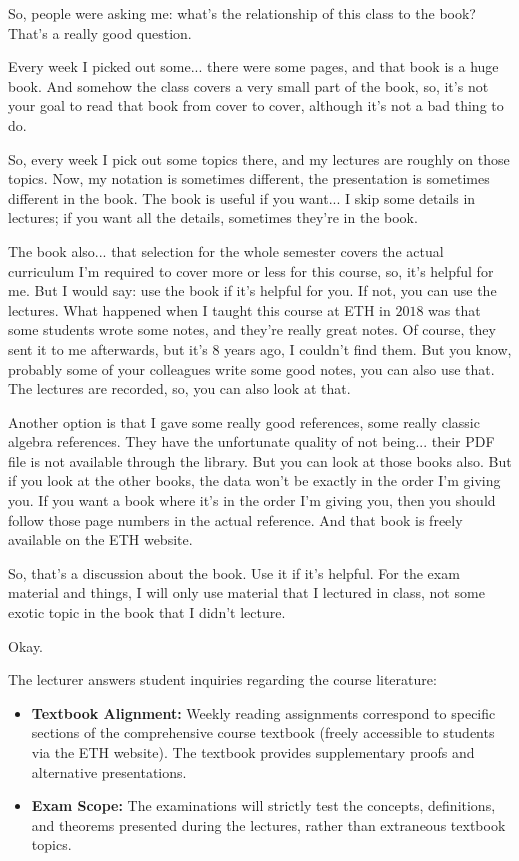 \begin{speech}[00:48:47 - 00:50:58]
So, people were asking me: what's the relationship of this class to the book? That's a really good question. 

Every week I picked out some... there were some pages, and that book is a huge book. And somehow the class covers a very small part of the book, so, it's not your goal to read that book from cover to cover, although it's not a bad thing to do. 

So, every week I pick out some topics there, and my lectures are roughly on those topics. Now, my notation is sometimes different, the presentation is sometimes different in the book. The book is useful if you want... I skip some details in lectures; if you want all the details, sometimes they're in the book. 

The book also... that selection for the whole semester covers the actual curriculum I'm required to cover more or less for this course, so, it's helpful for me. But I would say: use the book if it's helpful for you. If not, you can use the lectures. What happened when I taught this course at ETH in $2018$ was that some students wrote some notes, and they're really great notes. Of course, they sent it to me afterwards, but it's $8$ years ago, I couldn't find them. But you know, probably some of your colleagues write some good notes, you can also use that. The lectures are recorded, so, you can also look at that. 

Another option is that I gave some really good references, some really classic algebra references. They have the unfortunate quality of not being... their PDF file is not available through the library. But you can look at those books also. But if you look at the other books, the data won't be exactly in the order I'm giving you. If you want a book where it's in the order I'm giving you, then you should follow those page numbers in the actual reference. And that book is freely available on the ETH website. 

So, that's a discussion about the book. Use it if it's helpful. For the exam material and things, I will only use material that I lectured in class, not some exotic topic in the book that I didn't lecture. 

Okay.
\end{speech}

\begin{note}
The lecturer answers student inquiries regarding the course literature:
\begin{itemize}
    \item \textbf{Textbook Alignment:} Weekly reading assignments correspond to specific sections of the comprehensive course textbook (freely accessible to students via the ETH website). The textbook provides supplementary proofs and alternative presentations.
    \item \textbf{Exam Scope:} The examinations will strictly test the concepts, definitions, and theorems presented during the lectures, rather than extraneous textbook topics.
\end{itemize}
\end{note}

